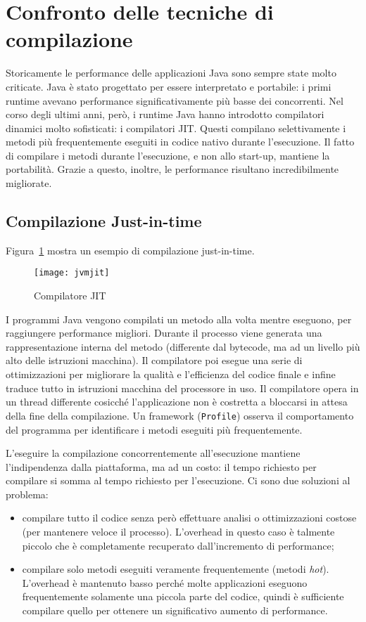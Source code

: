 \section{Confronto delle tecniche di compilazione}
Storicamente le performance delle applicazioni Java sono sempre state molto criticate. Java è stato progettato per essere interpretato e portabile: i primi runtime avevano performance significativamente più basse dei concorrenti. Nel corso degli ultimi anni, però, i runtime Java hanno introdotto compilatori dinamici molto sofisticati: i compilatori JIT. Questi compilano selettivamente i metodi più frequentemente eseguiti in codice nativo durante l'esecuzione. Il fatto di compilare i metodi durante l'esecuzione, e non allo start-up, mantiene la portabilità. Grazie a questo, inoltre, le performance risultano incredibilmente migliorate. 

\subsection{Compilazione Just-in-time}
Figura~\ref{fig:jit} mostra un esempio di compilazione just-in-time. 
\begin{figure}
	\centering
	\texttt{[image: jvmjit]}
	\caption[Compilatore JIT]{Compilatore JIT}
	\label{fig:jit}
\end{figure}
I programmi Java vengono compilati un metodo alla volta mentre eseguono, per raggiungere performance migliori. Durante il processo viene generata una rappresentazione interna del metodo (differente dal bytecode, ma ad un livello più alto delle istruzioni macchina). Il compilatore poi esegue una serie di ottimizzazioni per migliorare la qualità e l'efficienza del codice finale e infine traduce tutto in istruzioni macchina del processore in uso. Il compilatore opera in un thread differente cosicché l'applicazione non è costretta a bloccarsi in attesa della fine della compilazione. Un framework (\texttt{Profile}) osserva il comportamento del programma per identificare i metodi eseguiti più frequentemente. 

L'eseguire la compilazione concorrentemente all'esecuzione mantiene l'indipendenza dalla piattaforma, ma ad un costo: il tempo richiesto per compilare si somma al tempo richiesto per l'esecuzione. Ci sono due soluzioni al problema:
\begin{itemize}
	\item compilare tutto il codice senza però effettuare analisi o ottimizzazioni costose (per mantenere veloce il processo). L'overhead in questo caso è talmente piccolo che è completamente recuperato dall'incremento di performance; 
	\item compilare solo metodi eseguiti veramente frequentemente (metodi \textit{hot}). L'overhead è mantenuto basso perché molte applicazioni eseguono frequentemente solamente una piccola parte del codice, quindi è sufficiente compilare quello per ottenere un significativo aumento di performance.
\end{itemize}

